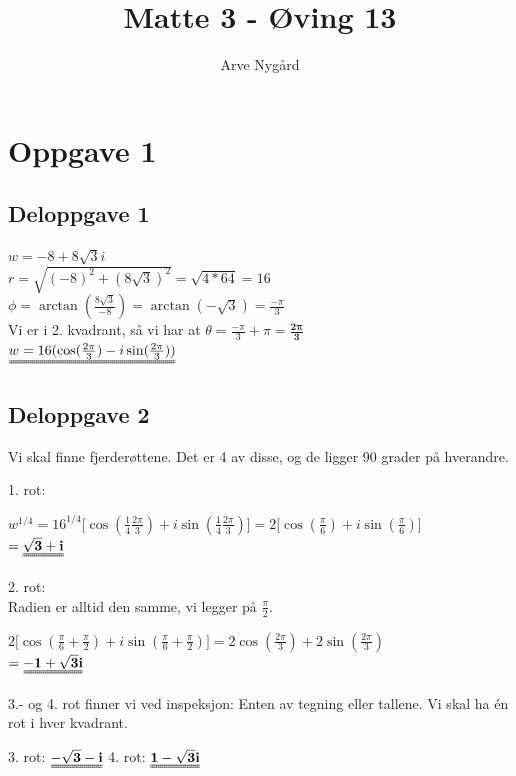 \documentclass[12pt,norsk,a4paper]{article}
\begin{document}
\title{Matte 3 - Øving 13}
\author {Arve Nygård}

\maketitle

\clearpage

\section{Oppgave 1}
\subsection{Deloppgave 1}
\begin{center}
$w= -8 + 8 \sqrt{3}i$\\[0.5cm]
$r = \sqrt{(-8)^2 + (8 \sqrt{3})^2} = \sqrt{4* 64} = 16    $\\[0.5cm]
$\phi = \arctan(\frac{8 \sqrt{3} }{-8}) = \arctan(- \sqrt{3}) = \frac{-\pi}{3}$\\[0.5cm]
Vi er i 2. kvadrant, så vi har at $\theta = \frac{-\pi}{3} + \pi = \mathbf{\frac{2\pi}{3} }$\\[0.5cm]
$\uuline{w = 16(\cos(\frac{2\pi}{3}) - i \sin(\frac{2\pi}{3}))}$
\end{center}
\subsection{Deloppgave 2} %
\label{sub:deloppgave_2}
Vi skal finne fjerderøttene. Det er 4 av disse, og de ligger 90 grader på hverandre.

1. rot:
\begin{center}
$w^{1/4} = 16^{1/4}\Bigg[\cos(\frac{1}{4} \frac{2\pi}{3}) + i \sin(\frac{1}{4} \frac{2\pi}{3})\Bigg] = 2\Bigg[\cos(\frac{\pi}{6}) + i \sin(\frac{\pi}{6})\Bigg]$ \\
$= \uuline{\mathbf{\sqrt{3}+i }}$
\end{center}

2. rot:\\
Radien er alltid den samme, vi legger på $\frac{\pi}{2}$.
\begin{center}

$2\Bigg[ \cos(\frac{\pi}{6} + \frac{\pi}{2}) + i \sin(\frac{\pi}{6} + \frac{\pi}{2}) \Bigg] = 2\cos(\frac{2\pi}{3}) + 2 \sin(\frac{2\pi}{3})$\\
$ = \mathbf{\uuline{-1 + \sqrt{3} i }}$
\end{center}
3.- og 4. rot finner vi ved inspeksjon: Enten av tegning eller tallene. Vi skal ha én rot i hver kvadrant.
\begin{center}
3. rot:
$\mathbf{\uuline{- \sqrt{3} - i }}$ \hspace{2cm}
4. rot:
$\mathbf{\uuline{1 -\sqrt{3} i }}$
\end{center}
\end{document}
